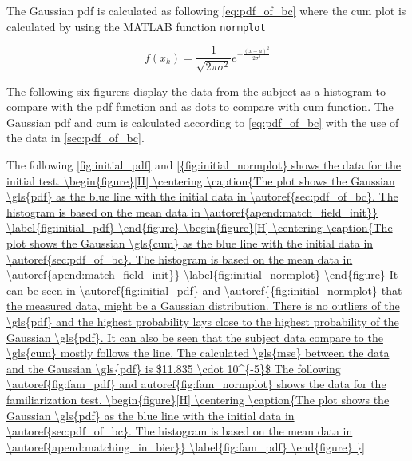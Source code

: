  The Gaussian \gls{pdf} is calculated as following \autoref{eq:pdf_of_bc} where the \gls{cum} plot is calculated by using the MATLAB function \texttt{normplot}

\begin{equation}\label{eq:pdf_of_bc}
f(x_{k}) = \frac{1}{\sqrt{2 \pi \sigma^2}}e^{-\frac{(x-\mu)^2}{2\sigma^2}}
\end{equation}


The following six figurers display the data from the subject as a histogram to compare with the \gls{pdf} function and as dots to compare with \gls{cum} function. The Gaussian \gls{pdf} and \gls{cum} is calculated according to \autoref{eq:pdf_of_bc} with the use of the data in \autoref{sec:pdf_of_bc}.


The following \autoref{fig:initial_pdf} and \autoref{{fig:initial_normplot} shows the data for the initial test.

 \begin{figure}[H]
	\centering
	
		\caption{The plot shows the Gaussian \gls{pdf} as the blue line with the initial data in \autoref{sec:pdf_of_bc}. The histogram is based on the mean data in \autoref{apend:match_field_init}}
		\label{fig:initial_pdf}
\end{figure}

 \begin{figure}[H]
	\centering
	
		\caption{The plot shows the Gaussian \gls{cum} as the blue line with the initial data in \autoref{sec:pdf_of_bc}. The histogram is based on the mean data in \autoref{apend:match_field_init}}
		\label{fig:initial_normplot}
\end{figure}


It can be seen in \autoref{fig:initial_pdf} and \autoref{{fig:initial_normplot} that the measured data, might be a Gaussian distribution. There is no outliers of the \gls{pdf} and the highest probability lays close to the highest probability of the Gaussian \gls{pdf}. It can also be seen that the subject data compare to the \gls{cum} mostly follows the line. The calculated \gls{mse} between the data and the Gaussian \gls{pdf} is $11.835 \cdot 10^{-5}$

The following \autoref{fig:fam_pdf} and autoref{fig:fam_normplot}  shows the data for the familiarization test.

 \begin{figure}[H]
	\centering
	
		\caption{The plot shows the Gaussian  \gls{pdf} as the blue line with the initial data in \autoref{sec:pdf_of_bc}. The histogram is based on the mean data in \autoref{apend:matching_in_bier}}
		\label{fig:fam_pdf}
\end{figure}

}}
